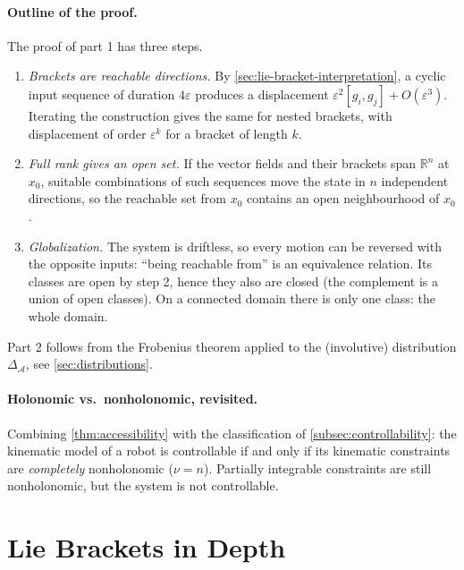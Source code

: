 \paragraph{Outline of the proof.}
The proof of part 1 has three steps.
\begin{enumerate}
    \item \emph{Brackets are reachable directions.} By
          \cref{sec:lie-bracket-interpretation}, a cyclic input
          sequence of duration \( 4\varepsilon \) produces a
          displacement \( \varepsilon^2 [g_i, g_j] + O(\varepsilon^3) \).
          Iterating the construction gives the same for nested
          brackets, with displacement of order \( \varepsilon^{k} \) for
          a bracket of length \( k \).
    \item \emph{Full rank gives an open set.} If the vector fields and
          their brackets span \( \mathbb{R}^n \) at \( x_0 \), suitable
          combinations of such sequences move the state in \( n \)
          independent directions, so the reachable set from \( x_0 \)
          contains an open neighbourhood of \( x_0 \).
    \item \emph{Globalization.} The system is driftless, so every
          motion can be reversed with the opposite inputs: ``being
          reachable from'' is an equivalence relation. Its classes are
          open by step 2, hence they also are closed (the complement is
          a union of open classes). On a connected domain there is
          only one class: the whole domain.
\end{enumerate}
Part 2 follows from the Frobenius theorem applied to the (involutive)
distribution \( \Delta_{\mathcal{A}} \), see \cref{sec:distributions}.

\paragraph{Holonomic vs.\ nonholonomic, revisited.}
Combining \cref{thm:accessibility} with the classification of
\cref{subsec:controllability}: the kinematic model of a robot is
controllable if and only if its kinematic constraints are
\emph{completely} nonholonomic (\( \nu = n \)). Partially integrable
constraints are still nonholonomic, but the system is not controllable.

\section{Lie Brackets in Depth}
\label{sec:lie-brackets}

